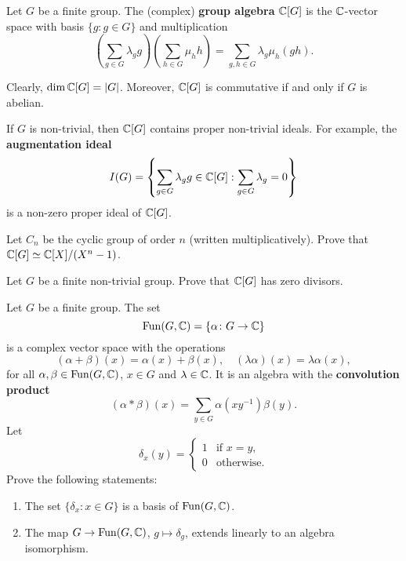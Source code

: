 \chapter{}


Let $G$ be a finite group. The (complex) \textbf{group
algebra} $\mathbb{C}[G]$ is the $\mathbb{C}$-vector space with
basis $\{g:g\in G\}$ and multiplication
\[
\left(\sum_{g\in G}\lambda_gg\right)\left(\sum_{h\in G}\mu_hh\right)
=\sum_{g,h\in G}\lambda_g\mu_h(gh).
\]

Clearly, $\dim \mathbb{C}[G]=|G|$. Moreover, 
$\mathbb{C}[G]$ is commutative if and only if $G$ is abelian. 

If $G$ is non-trivial, 
then $\mathbb{C}[G]$ contains proper non-trivial ideals. For example, 
the \textbf{augmentation ideal} 
\[
I(G)=\left\{\sum_{g\in G}\lambda_gg\in \mathbb{C}[G]:\sum_{g\in G}\lambda_g=0\right\}
\]
is a non-zero proper ideal of $\mathbb{C}[G]$. 

\begin{exercise}
Let $C_n$ be the cyclic group of order $n$ (written multiplicatively).
Prove that $\mathbb{C}[G]\simeq \mathbb{C}[X]/(X^n-1)$. 
\end{exercise}

\begin{exercise}
    Let $G$ be a finite non-trivial group. Prove that
    $\mathbb{C}[G]$ has zero divisors. 
\end{exercise}

\begin{exercise}
    Let $G$ be a finite group. The set
    \[
    \operatorname{Fun}(G,\mathbb{C})=\{\alpha\colon G\to\mathbb{C}\}
    \]
    is a complex vector space with 
    the operations 
    \[
    (\alpha+\beta)(x)=\alpha(x)+\beta(x),
    \quad
    (\lambda\alpha)(x)=\lambda\alpha(x),
    \]
    for all $\alpha,\beta\in\operatorname{Fun}(G,\mathbb{C})$, $x\in G$ 
    and $\lambda\in\mathbb{C}$. It is an algebra
    with the \textbf{convolution product} 
    \[
    (\alpha*\beta)(x)=\sum_{y\in G}\alpha(xy^{-1})\beta(y).
    \]
    Let 
    \[
    \delta_x(y)=\begin{cases}
            1 & \text{if $x=y$},\\
            0 & \text{otherwise}.
        \end{cases}
    \]
    Prove the following statements:
    \begin{enumerate}
        \item 
        The set $\{\delta_x:x\in G\}$ is a basis
        of $\operatorname{Fun}(G,\mathbb{C})$. 
        \item The map $G\to\operatorname{Fun}(G,\mathbb{C})$, $g\mapsto\delta_g$, 
            extends linearly to an algebra isomorphism. 
    \end{enumerate}
\end{exercise}


